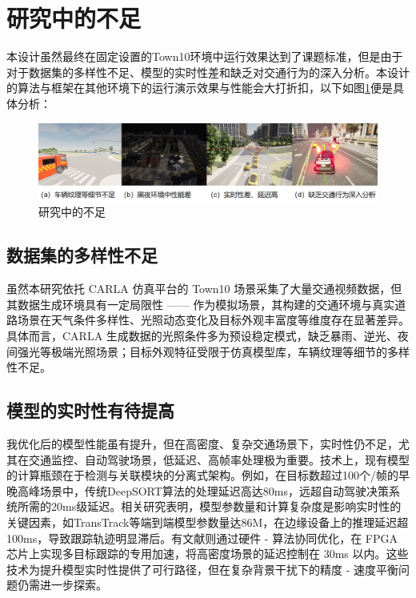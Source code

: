 \section{研究中的不足}


本设计虽然最终在固定设置的Town10环境中运行效果达到了课题标准，但是由于对于数据集的多样性不足、模型的实时性差和缺乏对交通行为的深入分析。本设计的算法与框架在其他环境下的运行演示效果与性能会大打折扣，以下如图\ref{fig:p34}便是具体分析：




\begin{figure}[htbp] %
	\centering
	\includegraphics[width=1\textwidth]{p34} %
	\caption{研究中的不足} %
	\label{fig:p34} %
\end{figure}



\subsection{数据集的多样性不足}

虽然本研究依托 CARLA 仿真平台的 Town10 场景采集了大量交通视频数据，但其数据生成环境具有一定局限性 —— 作为模拟场景，其构建的交通环境与真实道路场景在天气条件多样性、光照动态变化及目标外观丰富度等维度存在显著差异。具体而言，CARLA 生成数据的光照条件多为预设稳定模式，缺乏暴雨、逆光、夜间强光等极端光照场景；目标外观特征受限于仿真模型库，车辆纹理等细节的多样性不足。


\subsection{模型的实时性有待提高}


我优化后的模型性能虽有提升，但在高密度、复杂交通场景下，实时性仍不足，尤其在交通监控、自动驾驶场景，低延迟、高帧率处理极为重要。技术上，现有模型的计算瓶颈在于检测与关联模块的分离式架构。例如，在目标数超过100个/帧的早晚高峰场景中，传统DeepSORT算法的处理延迟高达80ms，远超自动驾驶决策系统所需的20ms级延迟。相关研究表明，模型参数量和计算复杂度是影响实时性的关键因素，如TransTrack等端到端模型参数量达86M，在边缘设备上的推理延迟超100ms，导致跟踪轨迹明显滞后。有文献\cite{redmon2018yolov3}则通过硬件 - 算法协同优化，在 FPGA 芯片上实现多目标跟踪的专用加速，将高密度场景的延迟控制在 30ms 以内。这些技术为提升模型实时性提供了可行路径，但在复杂背景干扰下的精度 - 速度平衡问题仍需进一步探索。

